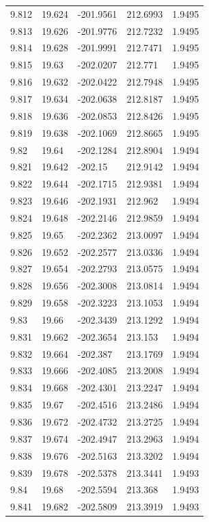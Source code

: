 \begin{tabular}{lllll}
9.812 & 19.624 & -201.9561 & 212.6993 & 1.9495 \\
9.813 & 19.626 & -201.9776 & 212.7232 & 1.9495 \\
9.814 & 19.628 & -201.9991 & 212.7471 & 1.9495 \\
9.815 & 19.63 & -202.0207 & 212.771 & 1.9495 \\
9.816 & 19.632 & -202.0422 & 212.7948 & 1.9495 \\
9.817 & 19.634 & -202.0638 & 212.8187 & 1.9495 \\
9.818 & 19.636 & -202.0853 & 212.8426 & 1.9495 \\
9.819 & 19.638 & -202.1069 & 212.8665 & 1.9495 \\
9.82 & 19.64 & -202.1284 & 212.8904 & 1.9494 \\
9.821 & 19.642 & -202.15 & 212.9142 & 1.9494 \\
9.822 & 19.644 & -202.1715 & 212.9381 & 1.9494 \\
9.823 & 19.646 & -202.1931 & 212.962 & 1.9494 \\
9.824 & 19.648 & -202.2146 & 212.9859 & 1.9494 \\
9.825 & 19.65 & -202.2362 & 213.0097 & 1.9494 \\
9.826 & 19.652 & -202.2577 & 213.0336 & 1.9494 \\
9.827 & 19.654 & -202.2793 & 213.0575 & 1.9494 \\
9.828 & 19.656 & -202.3008 & 213.0814 & 1.9494 \\
9.829 & 19.658 & -202.3223 & 213.1053 & 1.9494 \\
9.83 & 19.66 & -202.3439 & 213.1292 & 1.9494 \\
9.831 & 19.662 & -202.3654 & 213.153 & 1.9494 \\
9.832 & 19.664 & -202.387 & 213.1769 & 1.9494 \\
9.833 & 19.666 & -202.4085 & 213.2008 & 1.9494 \\
9.834 & 19.668 & -202.4301 & 213.2247 & 1.9494 \\
9.835 & 19.67 & -202.4516 & 213.2486 & 1.9494 \\
9.836 & 19.672 & -202.4732 & 213.2725 & 1.9494 \\
9.837 & 19.674 & -202.4947 & 213.2963 & 1.9494 \\
9.838 & 19.676 & -202.5163 & 213.3202 & 1.9494 \\
9.839 & 19.678 & -202.5378 & 213.3441 & 1.9493 \\
9.84 & 19.68 & -202.5594 & 213.368 & 1.9493 \\
9.841 & 19.682 & -202.5809 & 213.3919 & 1.9493 \\

\end{tabular}
